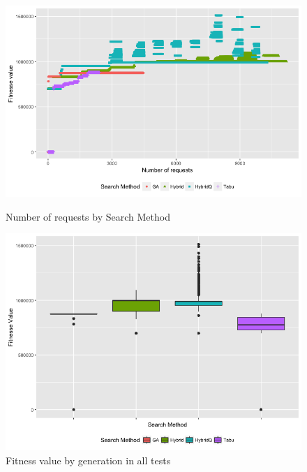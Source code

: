 \documentclass{bmcart}
\begin{document}
\begin{backmatter}
\begin{figure}[h]
\begin{minipage}{.5\textwidth}
\centering
\includegraphics{./images/experiment3-3.png}
\caption{Number of requests by Search Method}
\label{fig:numberofrequestsbysearchmethod3}
\end{minipage}
\begin{minipage}{.5\textwidth}
\centering
\includegraphics{./images/experiment3-4.png}
\caption{Fitness value by generation in all tests}
\label{fig:boxplot3}
\end{minipage}

\end{figure}

\end{backmatter}
\end{document}
